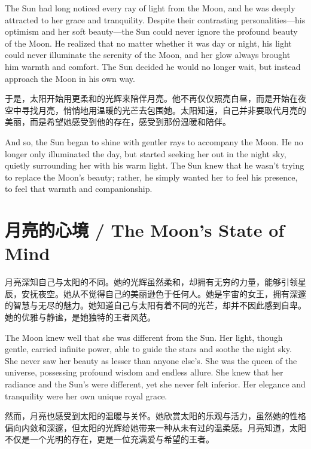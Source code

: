 \begin{flushright}
The Sun had long noticed every ray of light from the Moon, and he was deeply attracted to her grace and tranquility. Despite their contrasting personalities—his optimism and her soft beauty—the Sun could never ignore the profound beauty of the Moon. He realized that no matter whether it was day or night, his light could never illuminate the serenity of the Moon, and her glow always brought him warmth and comfort. The Sun decided he would no longer wait, but instead approach the Moon in his own way.
\end{flushright}

于是，太阳开始用更柔和的光辉来陪伴月亮。他不再仅仅照亮白昼，而是开始在夜空中寻找月亮，悄悄地用温暖的光芒去包围她。太阳知道，自己并非要取代月亮的美丽，而是希望她感受到他的存在，感受到那份温暖和陪伴。

\begin{flushright}
And so, the Sun began to shine with gentler rays to accompany the Moon. He no longer only illuminated the day, but started seeking her out in the night sky, quietly surrounding her with his warm light. The Sun knew that he wasn’t trying to replace the Moon's beauty; rather, he simply wanted her to feel his presence, to feel that warmth and companionship.
\end{flushright}

\section*{月亮的心境 / The Moon’s State of Mind}

月亮深知自己与太阳的不同。她的光辉虽然柔和，却拥有无穷的力量，能够引领星辰，安抚夜空。她从不觉得自己的美丽逊色于任何人。她是宇宙的女王，拥有深邃的智慧与无尽的魅力。她知道自己与太阳有着不同的光芒，却并不因此感到自卑。她的优雅与静谧，是她独特的王者风范。

\begin{flushright}
The Moon knew well that she was different from the Sun. Her light, though gentle, carried infinite power, able to guide the stars and soothe the night sky. She never saw her beauty as lesser than anyone else’s. She was the queen of the universe, possessing profound wisdom and endless allure. She knew that her radiance and the Sun’s were different, yet she never felt inferior. Her elegance and tranquility were her own unique royal grace.
\end{flushright}

然而，月亮也感受到太阳的温暖与关怀。她欣赏太阳的乐观与活力，虽然她的性格偏向内敛和深邃，但太阳的光辉给她带来一种从未有过的温柔感。月亮知道，太阳不仅是一个光明的存在，更是一位充满爱与希望的王者。

